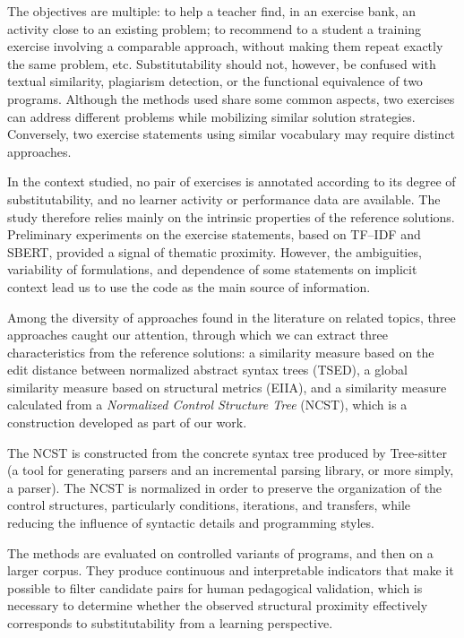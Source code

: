 \documentclass[12pt,a4paper,oneside]{report}
\begin{document}
The objectives are multiple: to help a teacher find, in an exercise bank, an activity 
close to an existing problem; to recommend to a student a training exercise involving a comparable approach, without making them repeat exactly the same problem, etc. Substitutability should not, however, be confused with textual similarity, plagiarism detection, or the functional equivalence of two programs. Although the methods used share some common aspects, two exercises can address different problems while mobilizing similar solution strategies. Conversely, two exercise statements using similar vocabulary may require distinct approaches.

In the context studied, no pair of exercises is annotated according to its degree of 
substitutability, and no learner activity or performance data are available. The study 
therefore relies mainly on the intrinsic properties of the reference solutions. Preliminary experiments on the exercise statements, based on TF--IDF and SBERT, provided a signal of thematic proximity. However, the ambiguities, variability of formulations, and dependence of some statements on implicit context lead us to use the code as the main source of information.

Among the diversity of approaches found in the literature on related topics, 
three approaches caught our attention, through which we can extract three 
characteristics from the reference solutions: a similarity measure based on the edit distance between normalized abstract syntax trees (TSED), a global similarity measure based on structural metrics (EIIA), and a similarity measure calculated from a \emph{Normalized Control Structure Tree} (NCST), which is a construction developed as part of our work.

The NCST is constructed from the concrete syntax tree produced by 
Tree-sitter (a tool for generating parsers and an incremental parsing 
library, or more simply, a parser). The NCST is normalized in order to
preserve the organization of the control structures, particularly conditions,
iterations, and transfers, while reducing the influence of syntactic details 
and programming styles.

The methods are evaluated on controlled variants of programs, and then on a 
larger corpus. They produce continuous and interpretable indicators that make it possible to filter candidate pairs for human pedagogical validation, which is necessary to determine whether the observed structural proximity effectively corresponds to substitutability from a learning perspective.
\end{document}
